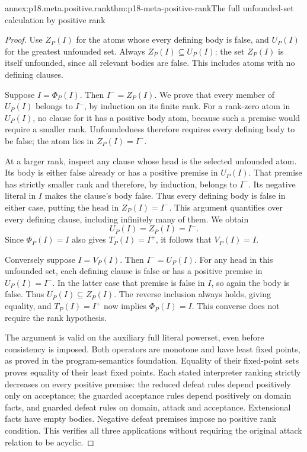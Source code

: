 \begin{annexitem}{annex:p18.meta.positive.rank}{thm:p18-meta-positive-rank}{The full unfounded-set calculation by positive rank}
\begin{proof}
Use \(Z_P(I)\) for the atoms whose every defining body
is false, and \(U_P(I)\) for the greatest unfounded set.
Always \(Z_P(I)\subseteq U_P(I)\): the set \(Z_P(I)\)
is itself unfounded, since all relevant bodies are
false. This includes atoms with no defining clauses.

Suppose \(I=\Phi_P(I)\). Then \(I^-=Z_P(I)\).
We prove that every member of \(U_P(I)\) belongs
to \(I^-\), by induction on its finite rank.
For a rank-zero atom in \(U_P(I)\), no clause for
it has a positive body atom, because such a premise
would require a smaller rank. Unfoundedness therefore
requires every defining body to be false; the atom
lies in \(Z_P(I)=I^-\).

At a larger rank, inspect any clause whose head
is the selected unfounded atom. Its body is either
false already or has a positive premise in \(U_P(I)\).
That premise has strictly smaller rank and therefore,
by induction, belongs to \(I^-\). Its negative
literal in \(I\) makes the clause's body false.
Thus every defining body is false in either case,
putting the head in \(Z_P(I)=I^-\).
This argument quantifies over every defining clause,
including infinitely many of them. We obtain
\[
                          U_P(I)=Z_P(I)=I^-.
\]
Since \(\Phi_P(I)=I\) also gives \(T_P(I)=I^+\),
it follows that \(V_P(I)=I\).

Conversely suppose \(I=V_P(I)\). Then
\(I^-=U_P(I)\). For any head in this unfounded set,
each defining clause is false or has a positive
premise in \(U_P(I)=I^-\). In the latter case
that premise is false in \(I\), so again the body
is false. Thus \(U_P(I)\subseteq Z_P(I)\).
The reverse inclusion always holds, giving equality,
and \(T_P(I)=I^+\) now implies \(\Phi_P(I)=I\).
This converse does not require the rank hypothesis.

The argument is valid on the auxiliary full literal
powerset, even before consistency is imposed. Both
operators are monotone and have least fixed points,
as proved in the program-semantics foundation.
Equality of their fixed-point sets proves equality
of their least fixed points.
Each stated interpreter ranking strictly decreases
on every positive premise: the reduced defeat
rules depend positively only on acceptance; the
guarded acceptance rules depend positively on
domain facts, and guarded defeat rules on domain,
attack and acceptance. Extensional facts have empty
bodies. Negative defeat premises impose no positive
rank condition. This verifies all three applications
without requiring the original attack relation
to be acyclic.
\end{proof}
\end{annexitem}

